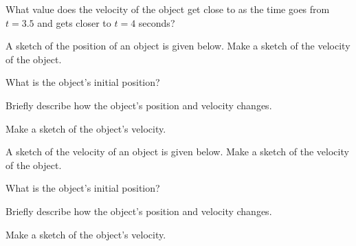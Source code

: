 \begin{problem}
    \scalebox{0.8}{}

    \begin{subproblem}
    \item What value does the velocity of the object get close to as
      the time goes from $t=3.5$ and gets closer to $t=4$ seconds?
    \end{subproblem}

    \clearpage

    \item A sketch of the position of an object is given below.
      Make a sketch of the velocity of the object.

      \scalebox{0.8}{}

      \begin{subproblem}
      \item What is the object's initial position?
      \item Briefly describe how the object's position and velocity changes.
        \vfill
      \item Make a sketch of the object's velocity.
      \end{subproblem}

    \clearpage


    \item A sketch of the velocity of an object is given below.
      Make a sketch of the velocity of the object.

      \scalebox{0.8}{}

      \begin{subproblem}
      \item What is the object's initial position?
      \item Briefly describe how the object's position and velocity changes.
        \vfill
      \item Make a sketch of the object's velocity.
      \end{subproblem}

      \clearpage

\end{problem}

\postClass

